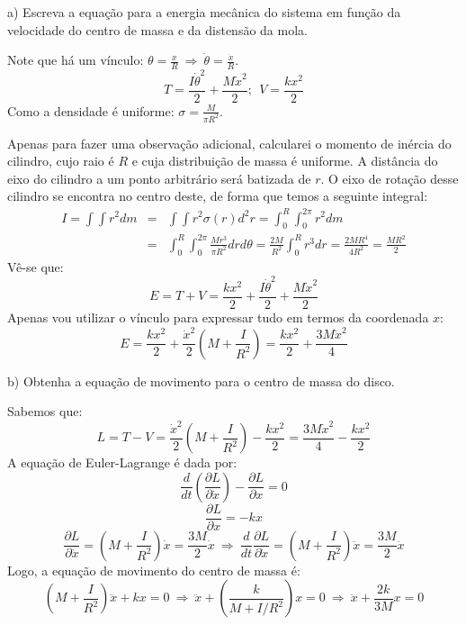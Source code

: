 \begin{enumerate}[start=1,label={\bfseries Q\arabic*.}]
a) Escreva a equação para a energia mecânica do sistema em função da velocidade do centro de massa e da distensão da mola.

\resposta Note que há um vínculo: $\theta = \frac{x}{R} \ \Rightarrow \ \dot{\theta} = \frac{\dot{x}}{R}$.
$$
T = \frac{I \dot{\theta}^{2}}{2} + \frac{M \dot{x}^{2}}{2}; \ \ V = \frac{k x^{2}}{2}
$$
Como a densidade é uniforme: $\sigma = \frac{M}{\pi R^{2}}$.

Apenas para fazer uma observação adicional, calcularei o momento de inércia do cilindro, cujo raio é $R$ e cuja distribuição de massa é uniforme. A distância do eixo do cilindro a um ponto arbitrário será batizada de $r$. O eixo de rotação desse cilindro se encontra no centro deste, de forma que temos a seguinte integral:
$$
\begin{array}{ccl}
  I = \int \int r^{2} dm  & = & \int \int r^{2} \sigma(r) d^{2} r = \int_{0}^{R} \int_{0}^{2\pi} r^{2} d m \\
   & = & \int_{0}^{R} \int_{0}^{2\pi} \frac{M r^{3}}{\pi R^{2}} dr d\theta = \frac{2M}{R^{2}} \int_{0}^{R} r^{3} dr = \frac{2 M R^{4}}{4R^{2}} = \frac{MR^{2}}{2}
\end{array}
$$
Vê-se que:
$$
 E = T + V = \frac{kx^{2}}{2} + \frac{I \dot{\theta}^{2}}{2} + \frac{M \dot{x}^{2}}{2}
 $$
Apenas vou utilizar o vínculo para expressar tudo em termos da coordenada $x$:
$$
 E = \frac{kx^{2}}{2} + \frac{\dot{x}^{2}}{2} \left( M + \frac{I}{R^{2}}  \right) = \frac{kx^{2}}{2} + \frac{3M \dot{x}^{2}}{4}
$$



b) Obtenha a equação de movimento para o centro de massa do disco.

\resposta

Sabemos que:
$$
 L = T - V =  \frac{\dot{x}^{2}}{2} \left( M + \frac{I}{R^{2}}  \right) - \frac{kx^{2}}{2} = \frac{3M \dot{x}^{2}}{4} - \frac{kx^{2}}{2}
$$
A equação de Euler-Lagrange é dada por:
$$
\frac{d}{dt} \left( \frac{\partial L}{\partial \dot{x}}  \right) - \frac{\partial L}{\partial x} = 0
$$
$$
\frac{\partial L}{\partial x} = -kx
$$
$$
\frac{\partial L}{\partial \dot{x}} = \left( M + \frac{I}{R^{2}}  \right) \dot{x} = \frac{3M}{2} \dot{x} \ \Rightarrow \ \frac{d}{dt} \frac{\partial L}{\partial \dot{x}} = \left( M + \frac{I}{R^{2}}  \right) \ddot{x} = \frac{3M}{2} \ddot{x}
$$
Logo, a equação de movimento do centro de massa é:
$$
\left( M + \frac{I}{R^{2}}  \right) \ddot{x} + kx = 0 \ \Rightarrow \ \ddot{x} + \left(\frac{k}{M + I/R^{2}}  \right) x = 0 \ \Rightarrow \ \ddot{x} + \frac{2k}{3M} x = 0
$$



\end{enumerate}
